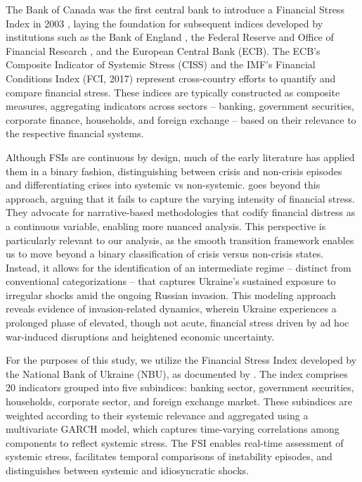 \documentclass[12pt,preprint,aps,author-year]{revtex4-1}
\begin{document}
The Bank of Canada was the first central bank to introduce a Financial Stress Index in 2003 \citep{illing2003}, laying the foundation for subsequent indices developed by institutions such as the Bank of England \citep{chatterjee2017}, the Federal Reserve \citep{carlson2011, stlouisfed} and Office of Financial Research \citep{monin2017}, and the European Central Bank (ECB). The ECB’s Composite Indicator of Systemic Stress (CISS) \citep{hollo2012} and the IMF’s Financial Conditions Index (FCI, 2017) \citep{imf_gfsr_2017} represent cross-country efforts to quantify and compare financial stress. These indices are typically constructed as composite measures, aggregating indicators across sectors – banking, government securities, corporate finance, households, and foreign exchange – based on their relevance to the respective financial systems.

Although FSIs are continuous by design, much of the early literature has applied them in a binary fashion, distinguishing between crisis and non-crisis episodes and differentiating crises into systemic vs non-systemic. \cite{romer2017} goes beyond this approach, arguing that it fails to capture the varying intensity of financial stress. They advocate for narrative-based methodologies that codify financial distress as a continuous variable, enabling more nuanced analysis. This perspective is particularly relevant to our analysis, as the smooth transition framework enables us to move beyond a binary classification of crisis versus non-crisis states. Instead, it allows for the identification of an intermediate regime – distinct from conventional categorizations – that captures Ukraine’s sustained exposure to irregular shocks amid the ongoing Russian invasion. This modeling approach reveals evidence of invasion-related dynamics, wherein Ukraine experiences a prolonged phase of elevated, though not acute, financial stress driven by ad hoc war-induced disruptions and heightened economic uncertainty.

For the purposes of this study, we utilize the Financial Stress Index developed by the National Bank of Ukraine (NBU), as documented by \cite{filatov2021}. The index comprises 20 indicators grouped into five subindices: banking sector, government securities, households, corporate sector, and foreign exchange market. These subindices are weighted according to their systemic relevance and aggregated using a multivariate GARCH model, which captures time-varying correlations among components to reflect systemic stress. The FSI enables real-time assessment of systemic stress, facilitates temporal comparisons of instability episodes, and distinguishes between systemic and idiosyncratic shocks.
\end{document}
